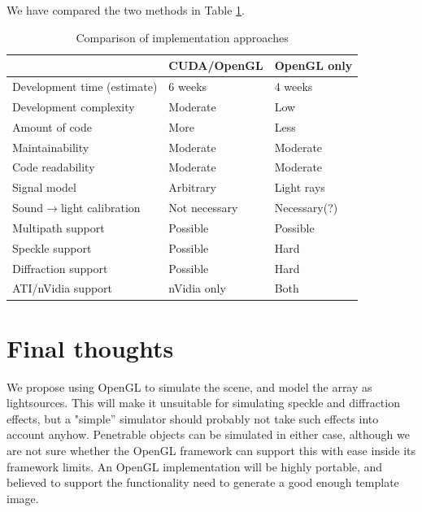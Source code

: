 \documentclass[
   article                                      %
 , 12pt                                         %
 , xelatex                                      %
 , bibtex                                       %
 , layout
]{common/mytemplate}
\begin{document}
We have compared the two methods in Table \ref{comparison}.

\begin{table}[H]\centering
\begin{tabular}[c]{l l l}\hline
\rowcolor{tabBlue}                  & CUDA/OpenGL    & OpenGL only \\\hline
Development time (estimate)         & 6 weeks        & 4 weeks     \\
Development complexity              & Moderate       & Low \\
Amount of code                      & More           & Less \\
Maintainability                     & Moderate       & Moderate \\
Code readability                    & Moderate       & Moderate \\
Signal model                        & Arbitrary      & Light rays  \\
Sound$\rightarrow$light calibration & Not necessary  & Necessary(?) \\
Multipath support                   & Possible       & Possible \\
Speckle support                     & Possible       & Hard \\
Diffraction support                 & Possible       & Hard \\
ATI/nVidia support                  & nVidia only    & Both \\
\end{tabular}
\vspace{5pt}\caption{Comparison of implementation approaches}\label{comparison}
\end{table}


\section{Final thoughts}

We propose using OpenGL to simulate the scene, and model the array as lightsources. This will make it unsuitable for simulating speckle and diffraction effects, but a "simple'' simulator should probably not take such effects into account anyhow. Penetrable objects can be simulated in either case, although we are not sure whether the OpenGL framework can support this with ease inside its framework limits. An OpenGL implementation will be highly portable, and believed to support the functionality need to generate a good enough template image.
\end{document}
